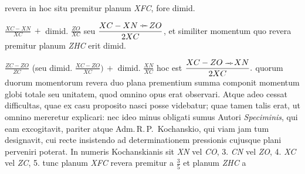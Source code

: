 revera in hoc situ premitur
%
%
planum \textit{XFC}, fore dimid. \rule[-1.4ex]{0pt}{3.6ex}$\displaystyle\frac{XC - XN}{XC}\,+$ %
dimid. $\displaystyle\frac{ZO}{XC}$ seu $\displaystyle\frac{XC - XN\ \raisebox{0.05\baselineskip}{\rotatebox{90}{\dag}}\, ZO}{2XC}$, et similiter momentum quo revera premitur planum \textit{ZHC} erit dimid. 
\rule[-2.4ex]{0pt}{5ex}$\displaystyle\frac{ZC-ZO}{ZC}$ (seu dimid. $\displaystyle\frac{XC-ZO}{XC})\,+$ dimid. $\displaystyle\frac{XN}{XC}$ hoc est $\displaystyle\frac{XC-ZO\ \raisebox{0.35\baselineskip}{\rotatebox{-90}{\dag}}\,XN}{2XC}.$ 
quorum duorum momentorum revera duo plana prementium summa componit momentum globi totale seu unitatem, quod omnino opus erat observari. 
\pend
\pstart
Atque adeo cessat difficultas, quae ex casu proposito nasci posse videbatur; quae tamen talis erat, ut omnino mereretur explicari: 
nec ideo minus obligati sumus Autori \cite{01995}\textit{Speciminis}, 
qui eam excogitavit, pariter atque Adm.\,R.\,P.~Kochanskio, 
qui viam jam tum designavit, cui recte insistendo ad determinationem pressionis %
cujusque plani perveniri poterat. 
In numeris Kochanskianis
sit \textit{XN} vel \textit{CO}, 3. \textit{CN} vel \textit{ZO}, 4. \textit{XC} vel \textit{ZC}, 5. 
tunc planum \textit{XFC} revera premitur a $\displaystyle\frac{3}{5}$ et planum \textit{ZHC} a 
